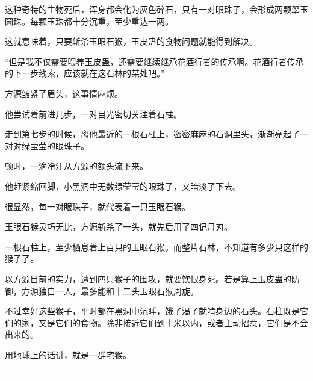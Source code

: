 \begin{this_body}
这种奇特的生物死后，浑身都会化为灰色碎石，只有一对眼珠子，会形成两颗翠玉圆珠。每颗玉珠都十分沉重，至少重达一两。

这就意味着，只要斩杀玉眼石猴，玉皮蛊的食物问题就能得到解决。

“但是我不仅需要喂养玉皮蛊，还需要继续继承花酒行者的传承啊。花酒行者传承的下一步线索，应该就在这石林的某处吧。”

方源皱紧了眉头，这事情麻烦。

他尝试着前进几步，一对目光密切关注着石柱。

走到第七步的时候，离他最近的一根石柱上，密密麻麻的石洞里头，渐渐亮起了一对对绿莹莹的眼珠子。

顿时，一滴冷汗从方源的额头流下来。

他赶紧缩回脚，小黑洞中无数绿莹莹的眼珠子，又暗淡了下去。

很显然，每一对眼珠子，就代表着一只玉眼石猴。

玉眼石猴灵巧无比，方源斩杀了一头，就先后用了四记月刃。

一根石柱上，至少栖息着上百只的玉眼石猴。而整片石林，不知道有多少只这样的猴子了。

以方源目前的实力，遭到四只猴子的围攻，就要饮恨身死。若是算上玉皮蛊的防御，方源独自一人，最多能和十二头玉眼石猴周旋。

不过幸好这些猴子，平时都在黑洞中沉睡，饿了渴了就啃身边的石头。石柱既是它们的家，又是它们的食物。除非接近它们到十米以内，或者主动招惹，它们是不会出来的。

用地球上的话讲，就是一群宅猴。

------------

\end{this_body}

